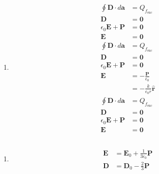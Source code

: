 \documentclass{article}
\renewcommand{\vec}[1]{\boldsymbol{\mathbf{#1}}}
\newcommand{\uvec}[1]{\hat{\vec{#1}}}
\begin{document}
\begin{enumerate}
  \item

        \begin{align*}
          \oint \vec{D} \cdot d \vec{a} & = Q_{f_\text{enc}}                 \\
          \vec{D}                       & = \vec{0}                          \\
          \epsilon_0 \vec{E} + \vec{P}  & = \vec{0}                          \\
          \vec{E}                       & = \vec{0}                          \\
          \oint \vec{D} \cdot d \vec{a} & = Q_{f_\text{enc}}                 \\
          \vec{D}                       & = \vec{0}                          \\
          \epsilon_0 \vec{E} + \vec{P}  & = \vec{0}                          \\
          \vec{E}                       & = -\frac{\vec{P}}{\epsilon_0}      \\
                                        & = -\frac{k}{\epsilon_0 r} \uvec{r} \\
          \oint \vec{D} \cdot d \vec{a} & = Q_{f_\text{enc}}                 \\
          \vec{D}                       & = \vec{0}                          \\
          \epsilon_0 \vec{E} + \vec{P}  & = \vec{0}                          \\
          \vec{E}                       & = \vec{0}
        \end{align*}
\end{enumerate}

\subsection{}

\begin{enumerate}
  \item

        \begin{align*}
          \vec{E} & = \vec{E}_0 + \frac{1}{3 \epsilon_0} \vec{P} \\
          \vec{D} & = \vec{D}_0 - \frac{2}{3} \vec{P}
        \end{align*}
\end{enumerate}
\end{document}

